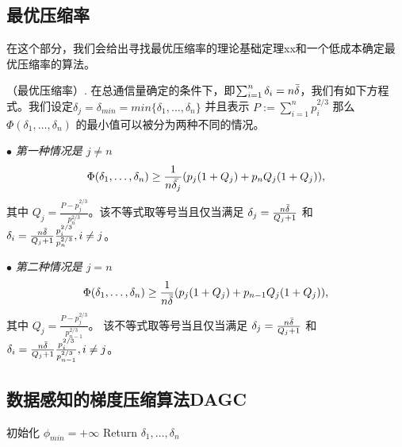 \fi

\subsection{最优压缩率}

在这个部分，我们会给出寻找最优压缩率的理论基础定理xx和一个低成本确定最优压缩率的算法。

\begin{theorem}
（最优压缩率）. 在总通信量确定的条件下，即$\sum_{i=1}^n \delta_i=n \Bar{\delta} $，我们有如下方程式。我们设定$\delta_j=\delta_{min}=min\{\delta_1,\ldots,\delta_n\}$ 并且表示 $P:=\sum_{i=1}^n p_i^{2/3}$ 那么$\Phi(\delta_1,\ldots,\delta_n)$ 的最小值可以被分为两种不同的情况。

\noindent$\bullet$ \textit{第一种情况是 $j\neq n$}
\begin{equation}
\Phi(\delta_1,\ldots,\delta_n)  \geq \frac{1}{n\Bar{\delta_j}}(p_j(1+Q_j)+p_n Q_j(1+Q_j)),
\label{theorem:4.4}
\end{equation}
其中 $Q_j=\frac{P-p_j^{2/3}}{p_n^{2/3}}$。该不等式取等号当且仅当满足 $\delta_j=\frac{n\Bar{\delta}}{Q_j+1}$ 和 $\delta_i=\frac{n\Bar{\delta}}{Q_j+1}\frac{p_i^{2/3}}{p_n^{2/3}}, i \neq j$。


\noindent$\bullet$ \textit{第二种情况是 $j=n$}
\begin{equation}
\Phi(\delta_1,\ldots,\delta_n)  \geq \frac{1}{n\Bar{\delta}}(p_j(1+Q_j)+p_{n-1} Q_j(1+Q_j)),
\label{theorem:4.5}
\end{equation}
其中 $Q_j=\frac{P-p_j^{2/3}}{p_{n-1}^{2/3}}$。 该不等式取等号当且仅当满足 $\delta_j=\frac{n\Bar{\delta}}{Q_j+1}$ 和 $\delta_i=\frac{n\Bar{\delta}}{Q_j+1}\frac{p_i^{2/3}}{p_{n-1}^{2/3}}, i \neq j$。
\label{theorem:4}
\end{theorem}

\subsection{数据感知的梯度压缩算法DAGC}


\begin{algorithm}[t]
    \SetAlgoLined %
	\caption{数据量感知的梯度压缩算法DAGC}%
	\label{algo:2}
	初始化 $\phi_{min} = +\infty$\; 
	Return $\delta_1,\ldots,\delta_n$\;
\end{algorithm}

